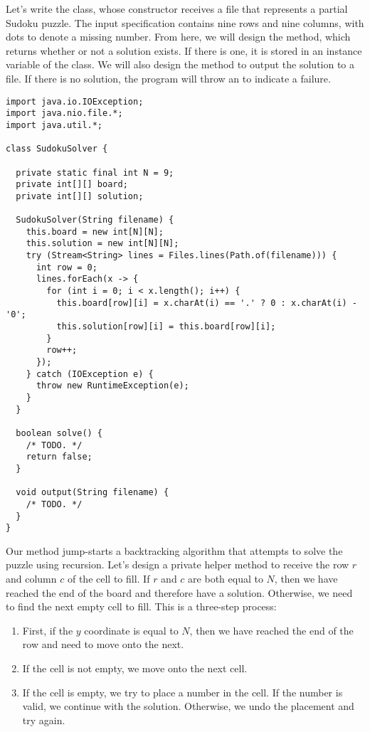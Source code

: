 Let's write the  class, whose constructor receives a file that represents a partial Sudoku puzzle. The input specification contains nine rows and nine columns, with dots to denote a missing number. From here, we will design the  method, which returns whether or not a solution exists. If there is one, it is stored in an instance variable of the class. We will also design the  method to output the solution to a file. If there is no solution, the program will throw an  to indicate a failure.

\begin{lstlisting}[language=MyJava]
import java.io.IOException;
import java.nio.file.*;
import java.util.*;

class SudokuSolver {

  private static final int N = 9;
  private int[][] board;
  private int[][] solution;

  SudokuSolver(String filename) {
    this.board = new int[N][N];
    this.solution = new int[N][N];
    try (Stream<String> lines = Files.lines(Path.of(filename))) {
      int row = 0;
      lines.forEach(x -> {
        for (int i = 0; i < x.length(); i++) {
          this.board[row][i] = x.charAt(i) == '.' ? 0 : x.charAt(i) - '0';
          this.solution[row][i] = this.board[row][i];
        }
        row++;
      });
    } catch (IOException e) {
      throw new RuntimeException(e);
    }
  }

  boolean solve() { 
    /* TODO. */ 
    return false;  
  }

  void output(String filename) { 
    /* TODO. */ 
  }
}
\end{lstlisting}

Our  method jump-starts a backtracking algorithm that attempts to solve the puzzle using recursion. Let's design a private helper method to receive the row $r$ and column $c$ of the cell to fill. If $r$ and $c$ are both equal to $N$, then we have reached the end of the board and therefore have a solution. Otherwise, we need to find the next empty cell to fill. This is a three-step process:
\begin{enumerate}[label=(\roman*)]
  \item First, if the $y$ coordinate is equal to $N$, then we have reached the end of the row and need to move onto the next.
  \item If the cell is not empty, we move onto the next cell.
  \item If the cell is empty, we try to place a number in the cell. If the number is valid, we continue with the solution. Otherwise, we undo the placement and try again.
\end{enumerate}

